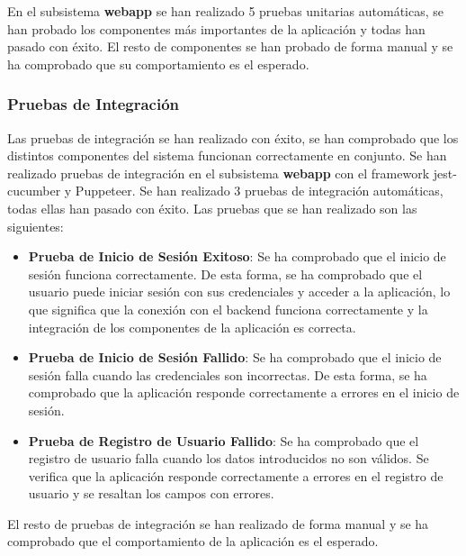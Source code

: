 En el subsistema \textbf{webapp} se han realizado 5 pruebas unitarias automáticas, se han probado los componentes más importantes de la aplicación y todas han pasado con éxito.
El resto de componentes se han probado de forma manual y se ha comprobado que su comportamiento es el esperado.


\subsubsection{Pruebas de Integración}
Las pruebas de integración se han realizado con éxito, se han comprobado que los distintos componentes del sistema funcionan correctamente en conjunto.
Se han realizado pruebas de integración en el subsistema \textbf{webapp} con el framework jest-cucumber y Puppeteer.
Se han realizado 3 pruebas de integración automáticas, todas ellas han pasado con éxito.
Las pruebas que se han realizado son las siguientes:
\begin{itemize}
    \item \textbf{Prueba de Inicio de Sesión Exitoso}: Se ha comprobado que el inicio de sesión funciona correctamente. De esta forma, se ha comprobado que el usuario puede iniciar sesión con sus credenciales y acceder a la aplicación, 
    lo que significa que la conexión con el backend funciona correctamente y la integración de los componentes de la aplicación es correcta.
    \item \textbf{Prueba de Inicio de Sesión Fallido}: Se ha comprobado que el inicio de sesión falla cuando las credenciales son incorrectas. De esta forma, se ha comprobado que la aplicación responde correctamente a errores en el inicio de sesión.
     \item \textbf{Prueba de Registro de Usuario Fallido}: Se ha comprobado que el registro de usuario falla cuando los datos introducidos no son válidos. 
     Se verifica que la aplicación responde correctamente a errores en el registro de usuario y se resaltan los campos con errores.
\end{itemize}

El resto de pruebas de integración se han realizado de forma manual y se ha comprobado que el comportamiento de la aplicación es el esperado.

